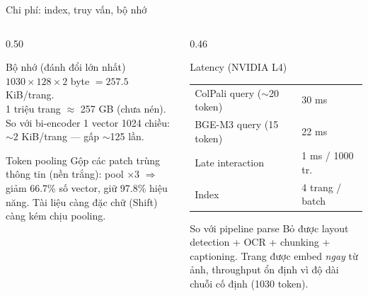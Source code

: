 \documentclass[aspectratio=169,10pt]{beamer}
\begin{document}
\begin{frame}{Chi phí: index, truy vấn, bộ nhớ}
  \begin{columns}[T]
    \begin{column}{0.50\textwidth}
      \begin{block}{\small Bộ nhớ (đánh đổi lớn nhất)}
        \footnotesize
        $1030\times128\times2$ byte $=\mathbf{257.5}$ KiB/trang.\\
        1 triệu trang $\approx$ 257 GB (chưa nén).\\
        So với bi-encoder 1 vector 1024 chiều: $\sim$2 KiB/trang --- gấp $\sim$125 lần.
      \end{block}
      \begin{block}{\small Token pooling}
        \footnotesize
        Gộp các patch trùng thông tin (nền trắng):
        pool $\times3$ $\Rightarrow$ giảm 66.7\% số vector, giữ 97.8\% hiệu năng.
        Tài liệu càng đặc chữ (Shift) càng kém chịu pooling.
      \end{block}
    \end{column}
    \begin{column}{0.46\textwidth}
      \begin{block}{\small Latency (NVIDIA L4)}
        \footnotesize
        \begin{tabular}{@{}ll@{}}
          ColPali query ($\sim$20 token) & 30 ms \\
          BGE-M3 query (15 token) & 22 ms \\
          Late interaction & 1 ms / 1000 tr. \\
          Index & 4 trang / batch \\
        \end{tabular}
      \end{block}
      \begin{block}{\small So với pipeline parse}
        \footnotesize
        Bỏ được layout detection + OCR + chunking + captioning.
        Trang được embed \emph{ngay} từ ảnh, throughput ổn định vì độ dài chuỗi cố định (1030 token).
      \end{block}
    \end{column}
  \end{columns}
\end{frame}
\end{document}
